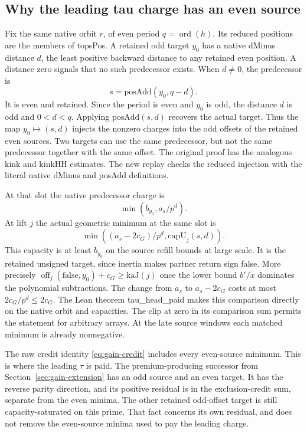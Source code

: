 \documentclass[12pt,letterpaper]{article}
\DeclareRobustCommand{\id}[1]{\mbox{\small\ttfamily #1}}
\begin{document}
\subsection{Why the leading tau charge has an even source}

Fix the same native orbit \(r\), of even period \(q=\operatorname{ord}(h)\). Its reduced positions are the members of \id{topsPos}. A retained odd target \(y_0\) has a native \id{dMinus} distance \(d\), the least positive backward distance to any retained even position. A distance zero signals that no such predecessor exists. When \(d\ne0\), the predecessor is
\[
                 s=\mathrm{posAdd}(y_0,q-d).
\]
It is even and retained. Since the period is even and \(y_0\) is odd, the distance \(d\) is odd and \(0<d<q\). Applying \(\mathrm{posAdd}(s,d)\) recovers the actual target. Thus the map \(y_0\mapsto(s,d)\) injects the nonzero charges into the odd offsets of the retained even sources. Two targets can use the same predecessor, but not the same predecessor together with the same offset. The original proof has the analogous \id{kink} and \id{kinkHH} estimates. The new replay checks the reduced injection with the literal native \id{dMinus} and \id{posAdd} definitions.

At that slot the native predecessor charge is
\[
                       \min(b_{y_0},a_s/p^d).
\]
At lift \(j\) the actual geometric minimum at the same slot is
\[
            \min((a_s-2c_G)/p^d,\mathrm{capU}_j(s,d)).
\]
This capacity is at least \(b_{y_0}\) on the source refill bounds at large scale. It is the retained unsigned target, since inertia makes \id{partner} return sign false. More precisely \(\operatorname{off}_j(\mathrm{false},y_0)+c_G\ge\mathrm{kaJ}(j)\) once the lower bound \(b'/x\) dominates the polynomial subtractions. The change from \(a_s\) to \(a_s-2c_G\) costs at most \(2c_G/p^d\le2c_G\). The Lean theorem \id{tau\_head\_paid} makes this comparison directly on the native orbit and capacities. The clip at zero in its comparison sum permits the statement for arbitrary arrays. At the late source windows each matched minimum is already nonnegative.

The raw credit identity \eqref{eq:gain-credit} includes every even-source minimum. This is where the leading \(\tau\) is paid. The premium-producing successor from Section~\ref{sec:gain-extension} has an odd source and an even target. It has the reverse parity direction, and its positive residual is in the exclusion-credit sum, separate from the even minima. The other retained odd-offset target is still capacity-saturated on this prime. That fact concerns its own residual, and does not remove the even-source minima used to pay the leading charge.
\end{document}
